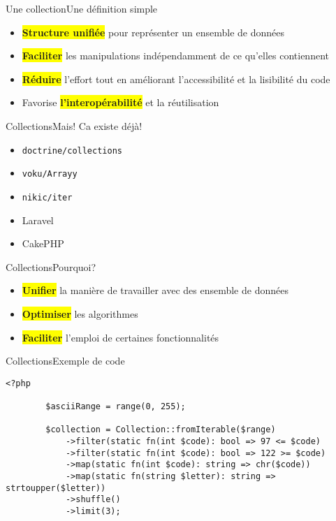 \begin{frame}{Une collection}{Une définition simple}
    \begin{itemize}[<+->]
        \item \colorbox{yellow}{\textbf{Structure unifiée}} pour représenter un ensemble de données
        \item \colorbox{yellow}{\textbf{Faciliter}} les manipulations indépendamment de ce qu'elles contiennent
        \item \colorbox{yellow}{\textbf{Réduire}} l'effort tout en améliorant l'accessibilité et la lisibilité du code
        \item Favorise \colorbox{yellow}{\textbf{l'interopérabilité}} et la réutilisation
    \end{itemize}
\end{frame}

\begin{frame}{Collections}{Mais! Ca existe déjà!}
    \begin{itemize}[<+->]
        \item \texttt{doctrine/collections}
        \item \texttt{voku/Arrayy}
        \item \texttt{nikic/iter}
        \item Laravel
        \item CakePHP
    \end{itemize}
\end{frame}

\begin{frame}{Collections}{Pourquoi?}
    \begin{itemize}[<+->]
        \item \colorbox{yellow}{\textbf{Unifier}} la manière de travailler avec des ensemble de données
        \item \colorbox{yellow}{\textbf{Optimiser}} les algorithmes
        \item \colorbox{yellow}{\textbf{Faciliter}} l'emploi de certaines fonctionnalités
    \end{itemize}
\end{frame}

\begin{frame}[fragile]{Collections}{Exemple de code}
    \begin{lstlisting}[firstnumber=1]
        <?php

        $asciiRange = range(0, 255);

        $collection = Collection::fromIterable($range)
            ->filter(static fn(int $code): bool => 97 <= $code)
            ->filter(static fn(int $code): bool => 122 >= $code)
            ->map(static fn(int $code): string => chr($code))
            ->map(static fn(string $letter): string => strtoupper($letter))
            ->shuffle()
            ->limit(3);

    \end{lstlisting}
\end{frame}

